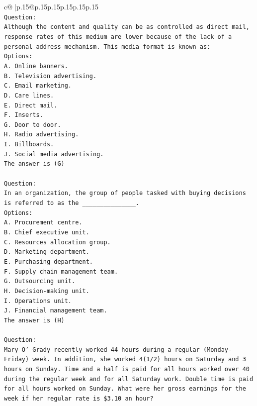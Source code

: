 \documentclass{article}
\begin{document}
{\begin{supertabular}{c@{$\;$}|p{.15\linewidth}@{}p{.15\linewidth}p{.15\linewidth}p{.15\linewidth}p{.15\linewidth}p{.15\linewidth}}
{{{\\ 
\texttt{Question:} \\
\texttt{Although the content and quality can be as controlled as direct mail, response rates of this medium are lower because of the lack of a personal address mechanism. This media format is known as:} \\
\texttt{Options:} \\
\texttt{A. Online banners.} \\
\texttt{B. Television advertising.} \\
\texttt{C. Email marketing.} \\
\texttt{D. Care lines.} \\
\texttt{E. Direct mail.} \\
\texttt{F. Inserts.} \\
\texttt{G. Door to door.} \\
\texttt{H. Radio advertising.} \\
\texttt{I. Billboards.} \\
\texttt{J. Social media advertising.} \\
\texttt{The answer is (G)} \\
\\ 
\texttt{Question:} \\
\texttt{In an organization, the group of people tasked with buying decisions is referred to as the \_\_\_\_\_\_\_\_\_\_\_\_\_\_\_.} \\
\texttt{Options:} \\
\texttt{A. Procurement centre.} \\
\texttt{B. Chief executive unit.} \\
\texttt{C. Resources allocation group.} \\
\texttt{D. Marketing department.} \\
\texttt{E. Purchasing department.} \\
\texttt{F. Supply chain management team.} \\
\texttt{G. Outsourcing unit.} \\
\texttt{H. Decision{-}making unit.} \\
\texttt{I. Operations unit.} \\
\texttt{J. Financial management team.} \\
\texttt{The answer is (H)} \\
\\ 
\texttt{Question:} \\
\texttt{Mary O' Grady recently worked 44 hours during a regular (Monday{-}Friday) week. In addition, she worked 4(1/2) hours on Saturday and 3 hours on Sunday. Time and a half is paid for all hours worked over 40 during the regular week and for all Saturday work. Double time is paid for all hours worked on Sunday. What were her gross earnings for the week if her regular rate is \$3.10 an hour?} \\
}}}
\end{supertabular}}
\end{document}
